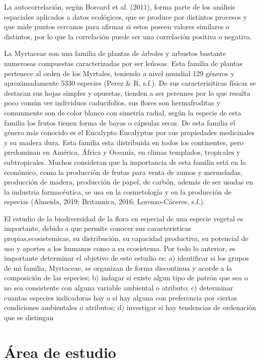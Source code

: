 \documentclass[11pt,]{article}
\begin{document}
La autocorrelación, según Borcard et al. (2011), forma parte de los
análisis espaciales aplicados a datos ecológicos, que se produce por
distintos procesos y que mide puntos cercanos para afirmar si estos
poseen valores similares o distintos, por lo que la correlación puede
ser una correlación positiva o negativa.

La Myrtaceae son una familia de plantas de árboles y arbustos bastante
numerosas compuestas caracterizadas por ser leñosas. Esta familia de
plantas pertenece al orden de los Myrtales, teniendo a nivel mundial 129
géneros y aproximadamente 5330 especies (Perez \& R, s.f.). De sus
caracterisiticas físicas se destacan sus hojas simples y opuestas,
tienden a ser perennes por lo que resulta poco común ver individuos
caducifolios, sus flores son hermafroditas y comunmente son de color
blanco con simetría radial, según la especie de esta familia los frutos
tienen forma de bayas o cápsulas secas. De esta familia el género más
conocido es el Eucalypto Eucalyptus por sus propiedades medicinales y su
madera dura. Esta familia esta distribuida en todos los continentes,
pero predominan en América, África y Oceanía, en climas templados,
tropicales y subtropicales. Muchos consideran que la importancia de esta
familia está en lo económico, como la producción de frutas para venta de
zumos y mermeladas, producción de madera, producción de papel, de
carbón, además de ser usadas en la industria farmacéutica, se usa en la
cosmetología y en la producción de especias (Almeida, 2019; Britannica,
2016; Lorenzo-Cáceres, s.f.).

El estudio de la biodiversidad de la flora en especial de una especie
vegetal es importante, debido a que permite conocer sus caracteristicas
propias,ecosistemicas, su distribución, su capacidad productiva, su
potencial de uso y aportes a los humanos como a su ecosistema. Por todo
lo anterior, es importante determinar el objetivo de este estudio es: a)
identificar si los grupos de mi familia, Myrtaceae, se organizan de
forma discontinua y acorde a la composición de las especies; b) indagar
si existe algun tipo de patrón que sea o no sea consistente con alguna
variable ambiental o atributo; c) determinar cuantas especies
indicadoras hay o si hay alguna con preferencia por ciertas condiciones
ambientales o atributos; d) investigar si hay tendencias de ordenación
que se distingan

\section{Área de estudio}\label{uxe1rea-de-estudio}
\end{document}
